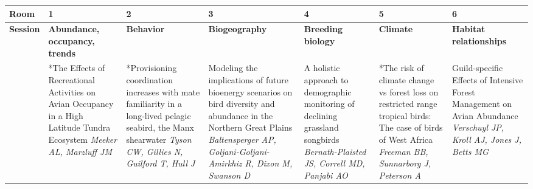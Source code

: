 \begin{tabular}{|x{0.75cm}|x{2.25cm}|x{2.25cm}|x{2.25cm}|x{2.25cm}|x{2.25cm}|x{2.25cm}|}\hline
Room & 1 & 2 & 3 & 4 & 5 & 6\\
\hline
\rule{0pt}{1em} \textbf{Session} &\footnotesize \textbf{Abundance, occupancy, trends} & \footnotesize \textbf{Behavior} & \footnotesize \textbf{Biogeography} & \footnotesize \textbf{Breeding biology} & \footnotesize \textbf{Climate} & \footnotesize \textbf{Habitat relationships}\\
\hline
{}&*The Effects of Recreational Activities on Avian Occupancy in a High Latitude Tundra Ecosystem \newline \newline \textit{Meeker AL, Marzluff JM} & *Provisioning coordination increases with mate familiarity in a long-lived pelagic seabird, the Manx shearwater \newline \newline \textit{Tyson CW, Gillies N, Guilford T, Hull J} & Modeling the implications of future bioenergy scenarios on bird diversity and abundance in the Northern Great Plains \newline \newline \textit{Baltensperger AP, Goljani-Goljani-Amirkhiz R, Dixon M, Swanson D} & A holistic approach to demographic monitoring of declining grassland songbirds \newline \newline \textit{Bernath-Plaisted JS, Correll MD, Panjabi AO} & *The risk of climate change vs forest loss on restricted range tropical birds: The case of birds of West Africa \newline \newline \textit{Freeman BB, Sunnarborg J, Peterson A} & Guild-specific Effects of Intensive Forest Management on Avian Abundance \newline \newline \textit{Verschuyl JP, Kroll AJ, Jones J, Betts MG}\\
\hline

\end{tabular}
